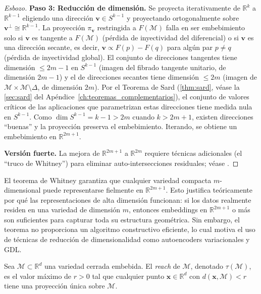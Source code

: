 \begin{proof}[Esbozo]
\textbf{Paso 3: Reducción de dimensión.}
Se proyecta iterativamente de $\mathbb{R}^k$ a $\mathbb{R}^{k-1}$ eligiendo una dirección $\mathbf{v} \in S^{k-1}$ y proyectando ortogonalmente sobre $\mathbf{v}^\perp \cong \mathbb{R}^{k-1}$. La proyección $\pi_\mathbf{v}$ restringida a $F(\mathcal{M})$ falla en ser embebimiento solo si $\mathbf{v}$ es tangente a $F(\mathcal{M})$ (pérdida de inyectividad del diferencial) o si $\mathbf{v}$ es una dirección secante, es decir, $\mathbf{v} \propto F(p) - F(q)$ para algún par $p \neq q$ (pérdida de inyectividad global). El conjunto de direcciones tangentes tiene dimensión $\leq 2m - 1$ en $S^{k-1}$ (imagen del fibrado tangente unitario, de dimensión $2m-1$) y el de direcciones secantes tiene dimensión $\leq 2m$ (imagen de $\mathcal{M} \times \mathcal{M} \setminus \Delta$, de dimensión $2m$). Por el Teorema de Sard (\autoref{thm:sard}, véase la \autoref{sec:sard} del Apéndice~\ref{ch:teoremas_complementarios}), el conjunto de valores críticos de las aplicaciones que parametrizan estas direcciones tiene medida nula en $S^{k-1}$. Como $\dim S^{k-1} = k - 1 > 2m$ cuando $k > 2m + 1$, existen direcciones ``buenas'' y la proyección preserva el embebimiento. Iterando, se obtiene un embebimiento en $\mathbb{R}^{2m+1}$.

\textbf{Versión fuerte.}
La mejora de $\mathbb{R}^{2m+1}$ a $\mathbb{R}^{2m}$ requiere técnicas adicionales (el ``truco de Whitney'') para eliminar auto-intersecciones residuales; véase \citep[Capítulo 6]{lee2012introduction}.
\end{proof}

El teorema de Whitney garantiza que cualquier variedad compacta $m$-dimensional puede representarse fielmente en $\mathbb{R}^{2m+1}$. Esto justifica teóricamente por qué las representaciones de alta dimensión funcionan: si los datos realmente residen en una variedad de dimensión $m$, entonces embeddings en $\mathbb{R}^{2m+1}$ o más son suficientes para capturar toda su estructura geométrica. Sin embargo, el teorema no proporciona un algoritmo constructivo eficiente, lo cual motiva el uso de técnicas de reducción de dimensionalidad como autoencoders variacionales y \gls{GDL}.

\begin{definition}\label{def:reach}
Sea $\mathcal{M} \subset \mathbb{R}^d$ una variedad cerrada embebida. El \textit{reach} de $\mathcal{M}$, denotado $\tau(\mathcal{M})$, es el valor máximo de $r > 0$ tal que cualquier punto $\mathbf{x} \in \mathbb{R}^d$ con $d(\mathbf{x}, \mathcal{M}) < r$ tiene una proyección única sobre $\mathcal{M}$.
\end{definition}

